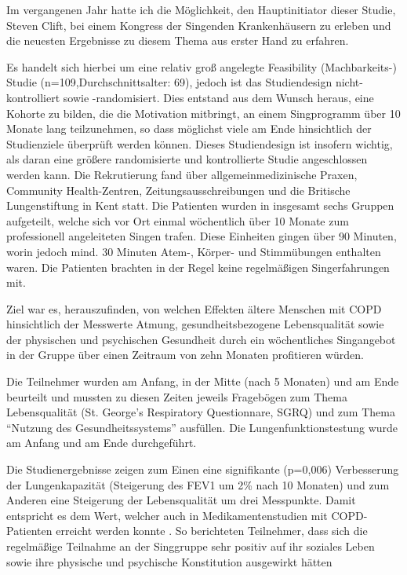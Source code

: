 Im vergangenen Jahr hatte ich die Möglichkeit, den Hauptinitiator dieser Studie, Steven Clift, bei einem Kongress der Singenden Krankenhäusern zu erleben und die neuesten Ergebnisse zu diesem Thema aus erster Hand zu erfahren. 

Es handelt sich hierbei um eine relativ groß angelegte Feasibility (Machbarkeits-) Studie (n=109,Durchschnittsalter: 69), jedoch ist das Studiendesign nicht-kontrolliert sowie -randomisiert. Dies entstand aus dem Wunsch heraus, eine Kohorte zu bilden, die die Motivation mitbringt, an einem Singprogramm über 10 Monate lang teilzunehmen, so dass möglichst viele am Ende hinsichtlich der Studienziele überprüft werden können. Dieses Studiendesign ist insofern wichtig, als daran eine größere randomisierte und kontrollierte Studie angeschlossen werden kann. Die Rekrutierung fand über allgemeinmedizinische Praxen, Community Health-Zentren, Zeitungsausschreibungen und die Britische Lungenstiftung in Kent statt. Die Patienten wurden in insgesamt sechs Gruppen aufgeteilt, welche sich vor Ort einmal wöchentlich über 10 Monate zum professionell angeleiteten Singen trafen. Diese Einheiten gingen über 90 Minuten, worin jedoch mind. 30 Minuten Atem-, Körper- und Stimmübungen enthalten waren. Die Patienten brachten in der Regel keine regelmäßigen Singerfahrungen mit.

Ziel war es, herauszufinden, von welchen Effekten ältere Menschen mit COPD hinsichtlich der Messwerte Atmung, gesundheitsbezogene Lebensqualität sowie der physischen und psychischen Gesundheit durch ein wöchentliches Singangebot in der Gruppe über einen Zeitraum von zehn Monaten profitieren würden. 

Die Teilnehmer wurden am Anfang, in der Mitte (nach 5 Monaten) und am Ende beurteilt und mussten zu diesen Zeiten jeweils Fragebögen zum Thema Lebensqualität (St. George's Respiratory Questionnare, SGRQ) und zum Thema "`Nutzung des Gesundheitssystems"' ausfüllen. Die Lungenfunktionstestung wurde am Anfang und am Ende durchgeführt. 

Die Studienergebnisse zeigen zum Einen eine signifikante (p=0,006) Verbesserung der Lungenkapazität (Steigerung des FEV1 um 2\% nach 10 Monaten) und zum Anderen eine Steigerung der Lebensqualität um drei Messpunkte. Damit entspricht es dem Wert, welcher auch in Medikamentenstudien mit COPD-Patienten erreicht werden konnte \autocite[vgl.]{clift2013a}. So berichteten Teilnehmer, dass sich die regelmäßige Teilnahme an der Singgruppe sehr positiv auf ihr soziales Leben sowie ihre physische und psychische Konstitution ausgewirkt hätten \autocite[vgl.][6ff.]{clift2013}

